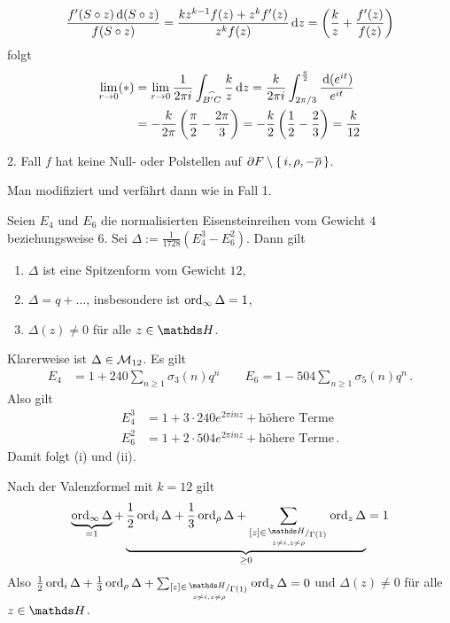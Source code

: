 \begin{bewe}
	\[
	\frac{f'(S \circ z) \,\mathrm{d} (S \circ z)}{f(S \circ z)}
	= \frac{kz^{k-1}f(z) + z^kf'(z)}{z^kf(z)} \,\mathrm{d} z
	= \left(\frac{k}{z} + \frac{f'(z)}{f(z)}\right)
	\]
	folgt
	\begin{align*}
	\lim_{r \to 0} (*)
	&= \lim_{r \to 0} \frac{1}{2\pi i} \int_{\stackrel{\frown}{B'C}} \frac{k}{z} \,\mathrm{d} z
	= \frac{k}{2\pi i} \int_{2\pi / 3}^{\frac{\pi}{2}} \frac{\,\mathrm{d}(e^{it})}{e^{it}} \\
	&= - \frac{k}{2\pi} \left(\frac{\pi}{2} - \frac{2\pi}{3}\right)
	= - \frac{k}{2} \left(\frac{1}{2} - \frac{2}{3}\right)
	= \frac{k}{12}
	\end{align*}
	
	
	2. Fall $f$ hat keine Null- oder Polstellen auf $\partial F \setminus \left\{\,i, \rho, -\overline{\rho}\,\right\}$.
	
	Man modifiziert und verfährt dann wie in Fall 1.
\end{bewe}


\begin{lemm}
	Seien $E_4$ und $E_6$ die normalisierten Eisensteinreihen vom Gewicht $4$ beziehungsweise $6$.
	Sei $\Delta := \frac{1}{1728} (E_4^3 - E_6^2)$.
	Dann gilt
	\begin{enumerate}
		\item $\Delta$ ist eine Spitzenform vom Gewicht $12$,
		\item $\Delta = q + \ldots $, insbesondere ist $\operatorname{ord}_\infty \Delta = 1$,
		\item $\Delta(z) \not= 0$ für alle $z \in \HH$.
	\end{enumerate}
\end{lemm}

\begin{bewe}
	Klarerweise ist $\Delta \in \mathcal{M}_{12}$.
	Es gilt
	\begin{align*}
	E_4 &= 1 + 240 \sum_{n\geq1} \sigma_3(n)q^n \qquad
	E_6 = 1 - 504\sum_{n \geq 1} \sigma_{5}(n)q^n
	\,.
	\end{align*}
	Also gilt
	\begin{align*}
	E_4^3 &= 1 + 3\cdot 240 e^{2\pi inz} + \text{höhere Terme} \\
	E_6^2 &= 1 + 2\cdot 504 e^{2\pi inz} + \text{höhere Terme}
	\,.
	\end{align*}
	Damit folgt (i) und (ii).
	
	Nach der Valenzformel mit $k=12$ gilt
	\[
	\underbrace{\ord_\infty \Delta}_{=1} + \underbrace{\frac{1}{2} \ord_i \Delta + \frac{1}{3} \ord_\rho \Delta + \sum_{\substack{[z] \in \modulo{\HH}{\Gamma(1)} \\ \scriptscriptstyle z \not\sim i, z\not\sim \rho}} \ord_z \Delta}_{\geq 0} = 1
	\]
	Also $\frac{1}{2} \ord_i \Delta + \frac{1}{3} \ord_\rho \Delta + \sum_{\substack{[z] \in \modulo{\HH}{\Gamma(1)} \\ \scriptscriptstyle z \not\sim i, z\not\sim \rho}} \ord_z \Delta = 0$ und $\Delta(z) \not= 0$ für alle $z\in\HH$.
\end{bewe}

